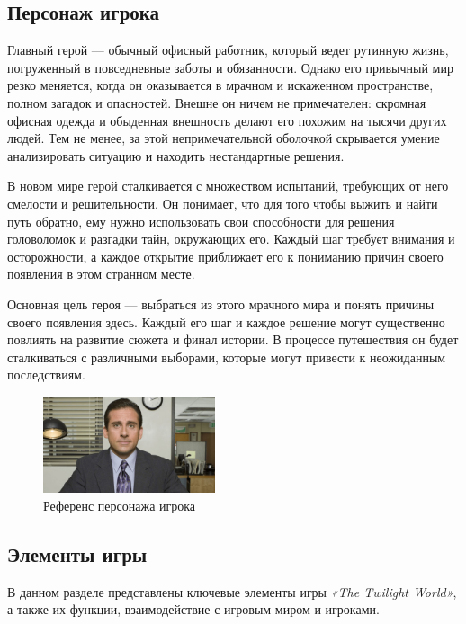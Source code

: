 \documentclass{article}
\begin{document}
	
	\newpage
	\subsection{Персонаж игрока}
	Главный герой — обычный офисный работник, который ведет рутинную жизнь, погруженный в повседневные заботы и обязанности. Однако его привычный мир резко меняется, когда он оказывается в мрачном и искаженном пространстве, полном загадок и опасностей. Внешне он ничем не примечателен: скромная офисная одежда и обыденная внешность делают его похожим на тысячи других людей. Тем не менее, за этой непримечательной оболочкой скрывается умение анализировать ситуацию и находить нестандартные решения.
	
	В новом мире герой сталкивается с множеством испытаний, требующих от него смелости и решительности. Он понимает, что для того чтобы выжить и найти путь обратно, ему нужно использовать свои способности для решения головоломок и разгадки тайн, окружающих его. Каждый шаг требует внимания и осторожности, а каждое открытие приближает его к пониманию причин своего появления в этом странном месте.
	
	Основная цель героя — выбраться из этого мрачного мира и понять причины своего появления здесь. Каждый его шаг и каждое решение могут существенно повлиять на развитие сюжета и финал истории. В процессе путешествия он будет сталкиваться с различными выборами, которые могут привести к неожиданным последствиям. 
	
	\begin{figure}[h]
		\centering
		\includegraphics[width=0.45\textwidth]{images/main.jpg}
		\caption{Референс персонажа игрока}
		\label{fig:main}
	\end{figure}
	
	
	\subsection{Элементы игры}
	В данном разделе представлены ключевые элементы игры \textit{«The Twilight World»}, а также их функции, взаимодействие с игровым миром и игроками.
	
\end{document}
